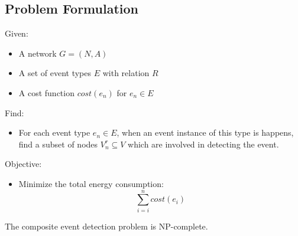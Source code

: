 \subsection{Problem Formulation}
Given:
\begin{itemize}
	\item A network \(G=(N, A)\)
	\item A set of event types \(E\) with relation \(R\)
	\item A cost function \(cost(e_n)\) for \(e_n\in E\)
\end{itemize}

Find:
\begin{itemize}
	\item For each event type \(e_n\in E\), when an event instance of this type is happens, find a subset of nodes \(V_n^r\subseteq V\) which are involved in detecting the event.
\end{itemize}

Objective:
\begin{itemize}
	\item Minimize the total energy consumption:
	\begin{displaymath}
	\sum_{i=i}^{n}cost(e_i)
	\end{displaymath}
\end{itemize}

\begin{theorem}
\label{thm:tableConstruction}
The composite event detection problem is NP-complete.
\end{theorem}

